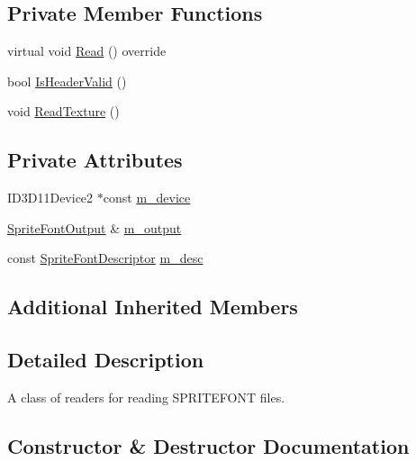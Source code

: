 \subsection*{Private Member Functions}
\begin{DoxyCompactItemize}
\item 
virtual void \hyperlink{classmage_1_1_sprite_font_reader_af380ae127285a88ae41e35a9067db412}{Read} () override
\item 
bool \hyperlink{classmage_1_1_sprite_font_reader_aa6dd3fc28e531d6db6ecda6ce3535d4c}{Is\+Header\+Valid} ()
\item 
void \hyperlink{classmage_1_1_sprite_font_reader_a12877a168b5dc2a95ec307a37d20ddca}{Read\+Texture} ()
\end{DoxyCompactItemize}
\subsection*{Private Attributes}
\begin{DoxyCompactItemize}
\item 
I\+D3\+D11\+Device2 $\ast$const \hyperlink{classmage_1_1_sprite_font_reader_aa77ee2a35b9ad15d5c1abfc6ffe5810c}{m\+\_\+device}
\item 
\hyperlink{structmage_1_1_sprite_font_output}{Sprite\+Font\+Output} \& \hyperlink{classmage_1_1_sprite_font_reader_a3df62ce71f85745c493b142c726261b3}{m\+\_\+output}
\item 
const \hyperlink{structmage_1_1_sprite_font_descriptor}{Sprite\+Font\+Descriptor} \hyperlink{classmage_1_1_sprite_font_reader_a577e1a05126b5b8d7bbdaa3e83bf32bf}{m\+\_\+desc}
\end{DoxyCompactItemize}
\subsection*{Additional Inherited Members}


\subsection{Detailed Description}
A class of readers for reading S\+P\+R\+I\+T\+E\+F\+O\+NT files. 

\subsection{Constructor \& Destructor Documentation}
\hypertarget{classmage_1_1_sprite_font_reader_ab257bc3c1f787182c14da56545ff6d10}{}\label{classmage_1_1_sprite_font_reader_ab257bc3c1f787182c14da56545ff6d10} 
